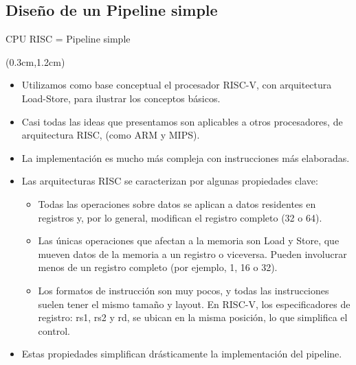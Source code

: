\documentclass[table,dvipsnames,aspectratio=169]{beamer}
\begin{document}
\subsection{Diseño de un Pipeline simple}
\begin{frame}{CPU RISC = Pipeline simple}
 \begin{textblock*}{\textwidth}(0.3cm,1.2cm)
  \begin{itemize}[<+->] \justifying
   \item Utilizamos como base conceptual el procesador RISC-V, con arquitectura Load-Store, para ilustrar los conceptos básicos.
   \item Casi todas las ideas que presentamos son aplicables a otros procesadores, de arquitectura RISC, (como ARM y MIPS).
   \item La implementación es mucho más compleja con instrucciones más elaboradas.
   \item Las arquitecturas RISC se caracterizan por algunas propiedades clave:
   \begin{itemize}
    \item Todas las operaciones sobre datos se aplican a datos residentes en registros y, por lo general, modifican el registro completo (32 o \SI{64}{\bit}).
    \item Las únicas operaciones que afectan a la memoria son Load y Store, que mueven datos de la memoria a un registro o viceversa. Pueden involucrar menos de un registro completo (por ejemplo, \SI{1}{\byte}, \SI{16}{\bit} o \SI{32}{\bit}).
    \item Los formatos de instrucción son muy pocos, y todas las instrucciones suelen tener el mismo tamaño y layout. En RISC-V, los especificadores de registro: rs1, rs2 y rd, se ubican en la misma posición, lo que simplifica el control.
   \end{itemize}
   \item Estas propiedades simplifican drásticamente la implementación del pipeline.
  \end{itemize}
 \end{textblock*}
\end{frame}
\end{document}
